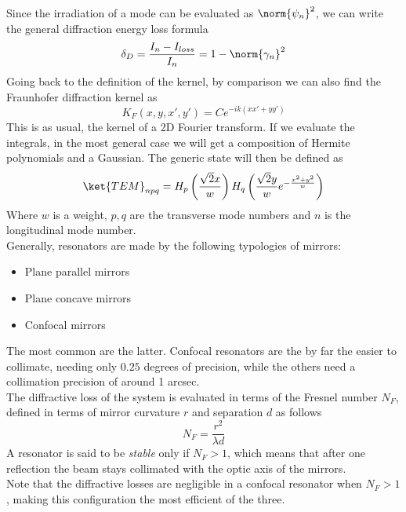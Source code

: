 \documentclass[../electromagnetism.tex]{subfiles}
\begin{document}
Since the irradiation of a mode can be evaluated as $\norm{\psi_n}^2$, we can write the general diffraction energy loss formula
\begin{equation}
	\delta_D=\frac{I_n-I_{loss}}{I_n}=1-\norm{\gamma_n}^2
	\label{eq:diffloss.res}
\end{equation}
Going back to the definition of the kernel, by comparison we can also find the Fraunhofer diffraction kernel as
\begin{equation}
	K_F(x, y, x', y')=Ce^{-ik(xx'+yy')}
	\label{eq:fraunhoferkern.res}
\end{equation}
This is as usual, the kernel of a 2D Fourier transform. If we evaluate the integrals, in the most general case we will get a composition of Hermite polynomials and a Gaussian. The generic state will then be defined as
\begin{equation}
	\ket{TEM}_{npq}=H_p\left( \frac{\sqrt{2}x}{w} \right)H_q\left( \frac{\sqrt{2}y}{w}e^{-\frac{x^2+y^2}{w}} \right)
	\label{eq:temstate.res}
\end{equation}
Where $w$ is a weight, $p, q$ are the transverse mode numbers and $n$ is the longitudinal mode number.\\
Generally, resonators are made by the following typologies of mirrors:
\begin{itemize}
\item Plane parallel mirrors
\item Plane concave mirrors
\item Confocal mirrors
\end{itemize}
The most common are the latter. Confocal resonators are the by far the easier to collimate, needing only $0.25$ degrees of precision, while the others need a collimation precision of around 1 arcsec.\\
The diffractive loss of the system is evaluated in terms of the Fresnel number $N_F$, defined in terms of mirror curvature $r$ and separation $d$ as follows
\begin{equation}
	N_F=\frac{r^2}{\lambda d}
	\label{eq:fresnelnr.res}
\end{equation}
A resonator is said to be \textit{stable} only if $N_F>1$, which means that after one reflection the beam stays collimated with the optic axis of the mirrors.\\
Note that the diffractive losses are negligible in a confocal resonator when $N_F>1$, making this configuration the most efficient of the three.\\
\end{document}
